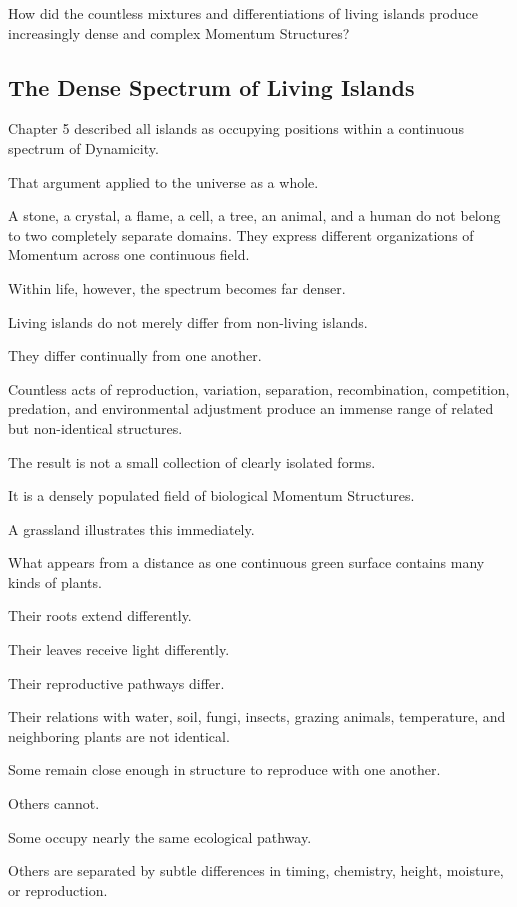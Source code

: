 How did the countless mixtures and differentiations of living islands produce increasingly dense and complex Momentum Structures?

\subsection*{\textbf{The Dense Spectrum of Living Islands}}


Chapter 5 described all islands as occupying positions within a continuous spectrum of Dynamicity.

That argument applied to the universe as a whole.

A stone, a crystal, a flame, a cell, a tree, an animal, and a human do not belong to two completely separate domains. They express different organizations of Momentum across one continuous field.

Within life, however, the spectrum becomes far denser.

Living islands do not merely differ from non-living islands.

They differ continually from one another.

Countless acts of reproduction, variation, separation, recombination, competition, predation, and environmental adjustment produce an immense range of related but non-identical structures.

The result is not a small collection of clearly isolated forms.

It is a densely populated field of biological Momentum Structures.

A grassland illustrates this immediately.

What appears from a distance as one continuous green surface contains many kinds of plants.

Their roots extend differently.

Their leaves receive light differently.

Their reproductive pathways differ.

Their relations with water, soil, fungi, insects, grazing animals, temperature, and neighboring plants are not identical.

Some remain close enough in structure to reproduce with one another.

Others cannot.

Some occupy nearly the same ecological pathway.

Others are separated by subtle differences in timing, chemistry, height, moisture, or reproduction.

